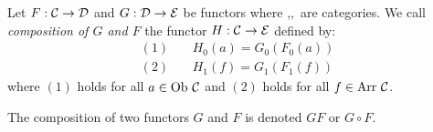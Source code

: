 \begin{defin}\label{Fun:def:composition}
    Let $F:\mbox{$\cal C$}\to\mbox{$\cal D$}$ and $G:\mbox{$\cal D$}\to\mbox{$\cal E$}$ be functors where \Cat,\Dat,\Eat\ 
    are categories. We call {\em composition of $G$ and $F$} the functor
    $H:\mbox{$\cal C$}\to\mbox{$\cal E$}$ defined by:
        \begin{eqnarray*}
            (1)&\ &H_{0}(a) = G_{0}(F_{0}(a))\\
            (2)&\ &H_{1}(f) = G_{1}(F_{1}(f))
        \end{eqnarray*}
    where $(1)$ holds for all $a\in\mbox{\rm Ob}\ \mbox{$\cal C$}$ and $(2)$ holds for all
    $f\in\mbox{\rm Arr}\ \mbox{$\cal C$}$.
\end{defin}

\begin{notation}\label{Fun:notation:composition}
    The composition of two functors $G$ and $F$ is denoted $GF$ or $G\circ F$.
\end{notation}

